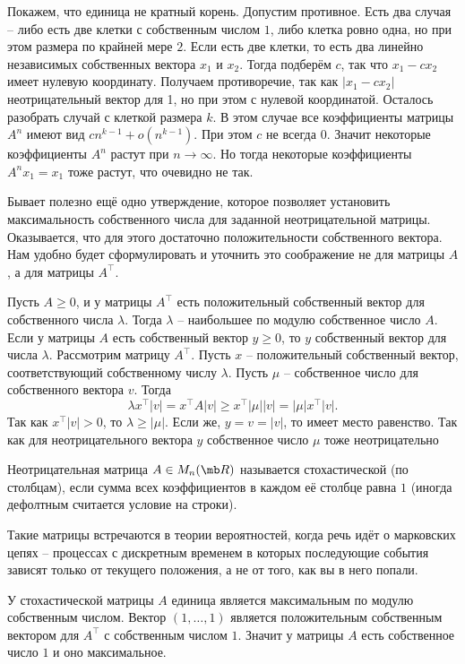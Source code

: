 Покажем, что единица не кратный корень. Допустим противное. Есть два случая -- либо есть две клетки с собственным числом $1$, либо клетка ровно одна, но при этом размера по крайней мере $2$. Если есть две клетки, то есть два линейно независимых собственных вектора  $x_1$ и $x_2$. Тогда подберём $c$, так что $x_1-cx_2$ имеет нулевую координату. Получаем противоречие, так как $|x_1-cx_2|$ неотрицательный вектор для 1, но при этом с нулевой координатой. Осталось разобрать случай с клеткой размера $k$. В этом случае все коэффициенты матрицы $A^n$ имеют вид $cn^{k-1}+o(n^{k-1})$. При этом $c$ не всегда $0$. Значит некоторые коэффициенты $A^n$ растут при $n\to \infty$. Но тогда некоторые коэффициенты $A^nx_1=x_1$ тоже растут, что очевидно не так.
\endproof

Бывает полезно ещё одно утверждение, которое позволяет установить максимальность собственного числа для заданной неотрицательной матрицы. Оказывается, что для этого достаточно положительности собственного вектора. Нам удобно будет сформулировать и уточнить это соображение не для матрицы $A$, а для матрицы $A^\top$.

\utv Пусть $A\geq 0$, и у матрицы $A^{\top}$ есть положительный собственный вектор для собственного числа $\lambda$. Тогда $\lambda$ -- наибольшее по модулю собственное число $A$. Если у матрицы $A$ есть собственный вектор $y\geq 0$, то $y$ собственный вектор для числа $\lambda$. 
\eutv
\proof Рассмотрим матрицу $A^{\top}$. Пусть $x$ -- положительный  собственный вектор, соответствующий собственному числу $\lambda$. Пусть $\mu$ -- собственное число для собственного вектора $v$. Тогда 
$$\lambda x^{\top}|v|= x^{\top}A|v|\geq x^{\top}|\mu| |v|=|\mu| x^{\top}|v|.$$
Так как $x^{\top}|v| >0$, то $\lambda\geq |\mu|$. Если же, $y=v=|v|$, то имеет место равенство. Так как для неотрицательного вектора $y$ собственное число $\mu$ тоже неотрицательно
\endproof

\dfn Неотрицательная матрица $A\in M_n(\mb R)$ называется стохастической (по столбцам),  если сумма всех коэффициентов в каждом её столбце равна $1$ (иногда дефолтным считается условие на строки). 
\edfn

\rm Такие матрицы встречаются в теории вероятностей, когда речь идёт о марковских цепях -- процессах с дискретным временем в которых последующие события зависят только от текущего положения, а не от того, как вы в него попали.  
\erm

\crl У стохастической матрицы $A$ единица является максимальным по модулю собственным числом.
\ecrl
\proof Вектор $(1,\dots,1)$ является положительным собственным вектором для $A^{\top}$ с собственным числом $1$. Значит у матрицы $A$ есть собственное число $1$ и оно максимальное. 
\endproof



